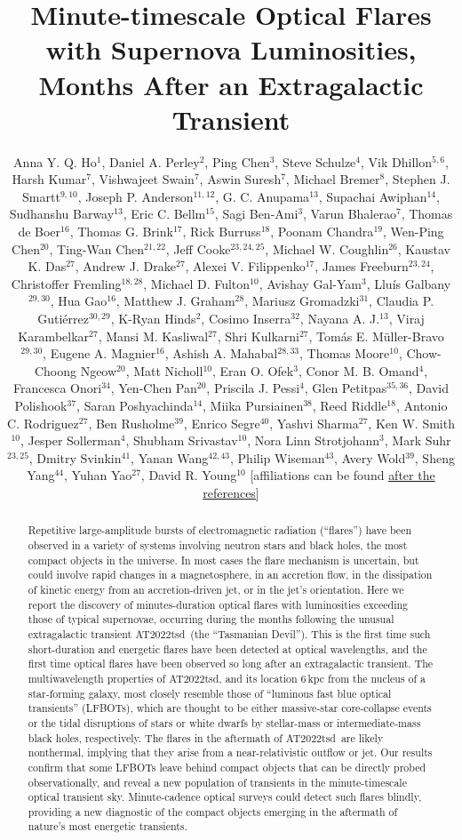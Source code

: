 \documentclass{nature_plusfigure}
\title{Minute-timescale Optical Flares with Supernova Luminosities, Months After an Extragalactic Transient}
\author{Anna Y. Q. Ho$^{1}$, Daniel A. Perley$^{2}$, Ping Chen$^{3}$, Steve Schulze$^{4}$, Vik Dhillon$^{5,6}$, Harsh Kumar$^{7}$, Vishwajeet Swain$^{7}$, Aswin Suresh$^{7}$, Michael Bremer$^{8}$, Stephen J. Smartt$^{9,10}$, Joseph P. Anderson$^{11,12}$, G. C. Anupama$^{13}$, Supachai Awiphan$^{14}$, Sudhanshu Barway$^{13}$, Eric C. Bellm$^{15}$, Sagi Ben-Ami$^{3}$, Varun Bhalerao$^{7}$, Thomas de Boer$^{16}$, Thomas G. Brink$^{17}$, Rick Burruss$^{18}$, Poonam Chandra$^{19}$, Wen-Ping Chen$^{20}$, Ting-Wan Chen$^{21,22}$, Jeff Cooke$^{23,24,25}$, Michael W. Coughlin$^{26}$, Kaustav K. Das$^{27}$, Andrew J. Drake$^{27}$, Alexei V. Filippenko$^{17}$, James Freeburn$^{23,24}$, Christoffer Fremling$^{18,28}$, Michael D. Fulton$^{10}$, Avishay Gal-Yam$^{3}$, Llu\'is Galbany$^{29,30}$, Hua Gao$^{16}$, Matthew J. Graham$^{28}$, Mariusz Gromadzki$^{31}$, Claudia P. Guti\'errez$^{30,29}$, K-Ryan Hinds$^{2}$, Cosimo Inserra$^{32}$, Nayana A. J.$^{13}$, Viraj Karambelkar$^{27}$, Mansi M. Kasliwal$^{27}$, Shri Kulkarni$^{27}$, Tom\'as E. M\"uller-Bravo$^{29,30}$, Eugene A. Magnier$^{16}$, Ashish A. Mahabal$^{28,33}$, Thomas Moore$^{10}$, Chow-Choong Ngeow$^{20}$, Matt Nicholl$^{10}$, Eran O. Ofek$^{3}$, Conor M. B. Omand$^{4}$, Francesca Onori$^{34}$, Yen-Chen Pan$^{20}$, Priscila J. Pessi$^{4}$, Glen Petitpas$^{35,36}$, David Polishook$^{37}$, Saran Poshyachinda$^{14}$, Miika Pursiainen$^{38}$, Reed Riddle$^{18}$, Antonio C. Rodriguez$^{27}$, Ben Rusholme$^{39}$, Enrico Segre$^{40}$, Yashvi Sharma$^{27}$, Ken W. Smith$^{10}$, Jesper Sollerman$^{4}$, Shubham Srivastav$^{10}$, Nora Linn Strotjohann$^{3}$, Mark Suhr$^{23,25}$, Dmitry Svinkin$^{41}$, Yanan Wang$^{42,43}$, Philip Wiseman$^{43}$, Avery Wold$^{39}$, Sheng Yang$^{44}$, Yuhan Yao$^{27}$, David R. Young$^{10}$
[affiliations can be found \hyperref[sec:affiliations]{after the references}]
	}
\newcommand{\at}{AT2022tsd}
\begin{document}
\maketitle

\begin{abstract}

Repetitive large-amplitude bursts of electromagnetic radiation (``flares'') have been observed in a variety of systems involving neutron stars and black holes\cite{Fender1997,Hurley1999,Marrone2008,Racusin2008,Nesci2021}, the most compact objects in the universe. In most cases the flare mechanism is uncertain, but could involve rapid changes in a magnetosphere\cite{Hurley1999}, in an accretion flow\cite{Fender2004,Yuan2014}, in the dissipation of kinetic energy from an accretion-driven jet\cite{Racusin2008}, or in the jet's orientation\cite{Raiteri2017}.
Here we report the discovery of minutes-duration optical flares with luminosities exceeding those of typical supernovae, occurring during the months following the unusual extragalactic transient \at\ (the ``Tasmanian Devil'').
This is the first time such short-duration and energetic flares have been detected at optical wavelengths, and the first time optical flares have been observed so long after an extragalactic transient.
The multiwavelength properties of \at, and its location 6\,kpc from the nucleus of a star-forming galaxy, most closely resemble those of ``luminous fast blue optical transients'' (LFBOTs\cite{Prentice2018,Margutti2019,Ho2022_RET,Metzger2022}), which are thought to be either massive-star core-collapse events\cite{Prentice2018,Margutti2019,Perley2019} or the tidal disruptions of stars\cite{Metzger2022} or white dwarfs\cite{Kuin2019,Perley2019} by stellar-mass or intermediate-mass black holes, respectively. The flares in the aftermath of \at\ are likely nonthermal, implying that they arise from a near-relativistic outflow or jet. %
Our results confirm that some LFBOTs leave behind compact objects that can be directly probed observationally,
and reveal a new population of transients in the minute-timescale optical transient sky.
Minute-cadence optical surveys\cite{Ofek2023,Law2022} could detect such flares blindly,
providing a new diagnostic of the compact objects emerging in the aftermath of nature's most energetic transients.

\end{abstract}
\end{document}
